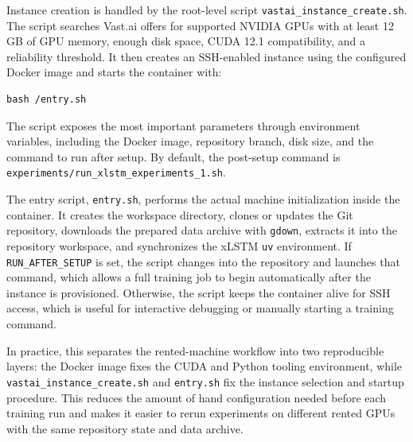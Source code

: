 Instance creation is handled by the root-level script \verb|vastai_instance_create.sh|. The script searches Vast.ai offers for supported NVIDIA GPUs with at least 12 GB of GPU memory, enough disk space, CUDA 12.1 compatibility, and a reliability threshold. It then creates an SSH-enabled instance using the configured Docker image and starts the container with:
\begin{verbatim}
bash /entry.sh
\end{verbatim}
The script exposes the most important parameters through environment variables, including the Docker image, repository branch, disk size, and the command to run after setup. By default, the post-setup command is \verb|experiments/run_xlstm_experiments_1.sh|.

The entry script, \verb|entry.sh|, performs the actual machine initialization inside the container. It creates the workspace directory, clones or updates the Git repository, downloads the prepared data archive with \verb|gdown|, extracts it into the repository workspace, and synchronizes the xLSTM \verb|uv| environment. If \verb|RUN_AFTER_SETUP| is set, the script changes into the repository and launches that command, which allows a full training job to begin automatically after the instance is provisioned. Otherwise, the script keeps the container alive for SSH access, which is useful for interactive debugging or manually starting a training command.

In practice, this separates the rented-machine workflow into two reproducible layers: the Docker image fixes the CUDA and Python tooling environment, while \verb|vastai_instance_create.sh| and \verb|entry.sh| fix the instance selection and startup procedure. This reduces the amount of hand configuration needed before each training run and makes it easier to rerun experiments on different rented GPUs with the same repository state and data archive.
